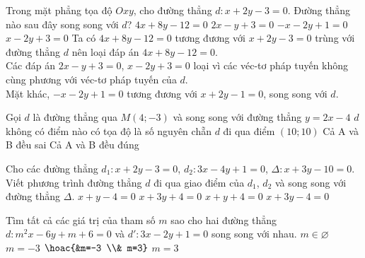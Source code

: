 	\begin{ex}%
		Trong mặt phẳng tọa độ $Oxy$, cho đường thẳng $d \colon x+2y-3=0$. Đường thẳng nào sau đây song song với $d$?
		\choice
		{$4x+8y-12=0$}
		{$2x-y+3=0$}
		{\True $-x-2y+1=0$}
		{$x-2y+3=0$}
		\loigiai
		{
			Ta có $4x+8y-12=0$ tương đương với $x+2y-3=0$ trùng với đường thẳng $d$ nên loại đáp án $4x+8y-12=0$.\\
			Các đáp án $2x-y+3=0$, $x-2y+3=0$ loại vì các véc-tơ pháp tuyến không cùng phương với véc-tơ pháp tuyến của $d$.\\
			Mặt khác, $-x-2y+1=0$ tương đương với $x+2y-1=0$, song song với $d$.
		}
	\end{ex}
	\begin{ex}%
		Gọi $d$ là đường thẳng qua $M(4;-3)$ và song song với đường thẳng $y=2x-4$
		\choice
		{\True $d$ không có điểm nào có tọa độ là số nguyên chẵn}
		{$d$ đi qua điểm $(10;10)$}
		{Cả A và B đều sai}
		{Cả A và B đều đúng}
	\end{ex}
	\begin{ex}%
		Cho các đường thẳng  $d_1 \colon x+2y-3=0$, $d_2 \colon 3x-4y+1=0$, $\Delta \colon x+3y-10=0$. Viết phương trình đường thẳng $d$ đi qua giao điểm của $d_1$, $d_2$ và song song với đường thẳng $\Delta$.
		\choice
		{$x+y-4=0$}
		{$x+3y+4=0$}
		{$x+y+4=0$}
		{\True $x+3y-4=0$}
	\end{ex}
	\begin{ex}%
		Tìm tất cả các giá trị của tham số $m$ sao cho hai đường thẳng $d \colon m^2x-6y+m+6=0$ và $d' \colon 3x-2y+1=0$ song song với nhau.
		\choice
		{$m \in \varnothing$}
		{$m=-3$}
		{$\hoac{&m=-3 \\& m=3}$}
		{\True $m=3$}
	\end{ex}
